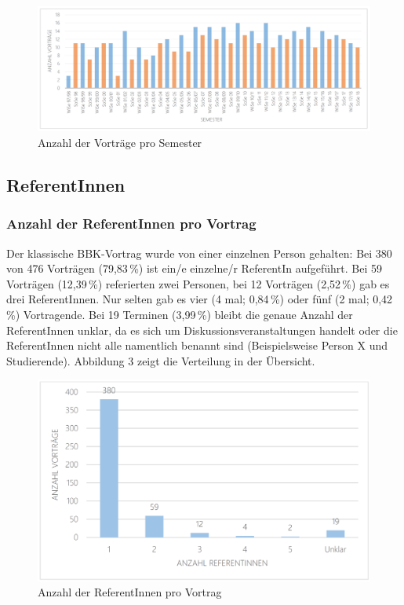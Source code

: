 \documentclass[a4paper,
fontsize=11pt,
oneside,
numbers=noperiodatend,
parskip=half-,
bibliography=totoc,
final
]{scrartcl}
\begin{document}
\begin{figure}[h!]
\centering
\includegraphics[width=16cm]{img/Abbildung2.png}
\caption{Anzahl der Vorträge pro Semester}
\end{figure}

\hypertarget{referentinnen}{%
\subsection{ReferentInnen}\label{referentinnen}}

\hypertarget{anzahl-der-referentinnen-pro-vortrag}{%
\subsubsection{Anzahl der ReferentInnen pro
Vortrag}\label{anzahl-der-referentinnen-pro-vortrag}}

Der klassische BBK-Vortrag wurde von einer einzelnen Person gehalten:
Bei 380 von 476 Vorträgen (79,83\,\%) ist ein/e einzelne/r ReferentIn
aufgeführt. Bei 59 Vorträgen (12,39\,\%) referierten zwei Personen, bei
12 Vorträgen (2,52\,\%) gab es drei ReferentInnen. Nur selten gab es vier
(4 mal; 0,84\,\%) oder fünf (2 mal; 0,42\,\%) Vortragende. Bei 19 Terminen
(3,99\,\%) bleibt die genaue Anzahl der ReferentInnen unklar, da es sich
um Diskussionsveranstaltungen handelt oder die ReferentInnen nicht alle
namentlich benannt sind (Beispielsweise Person X und Studierende).
Abbildung 3 zeigt die Verteilung in der Übersicht.

\begin{figure}[h!]
\centering
\includegraphics[width=12cm]{img/Abbildung3.png}
\caption{Anzahl der ReferentInnen pro Vortrag}
\end{figure}
\end{document}
